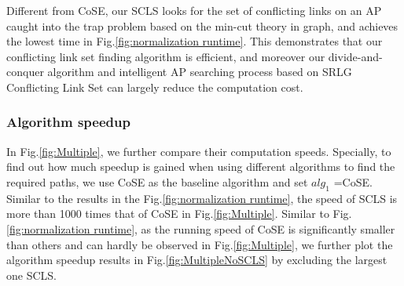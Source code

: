 
Different from CoSE, our SCLS looks for the set of conflicting links on an AP caught into the trap problem based on the min-cut theory in graph, and achieves the lowest time in Fig.\ref{fig:normalization runtime}. This demonstrates that our conflicting link set finding algorithm is efficient, and moreover our divide-and-conquer algorithm and intelligent AP searching process based on SRLG Conflicting Link Set can largely reduce the computation cost.


\subsubsection{Algorithm speedup}

In Fig.\ref{fig:Multiple}, we further compare their computation speeds. Specially, to find out how much speedup is gained when using different algorithms to find the required paths,
we use CoSE as the baseline algorithm and set $alg_1$ =CoSE. Similar to the results in the Fig.\ref{fig:normalization runtime}, the speed of SCLS is more than 1000 times that of  CoSE in Fig.\ref{fig:Multiple}.  Similar to Fig.\ref{fig:normalization runtime}, as the running speed of CoSE is significantly smaller than others and can hardly be observed in Fig.\ref{fig:Multiple}, we further plot the algorithm speedup results in Fig.\ref{fig:MultipleNoSCLS} by excluding the largest one SCLS.



